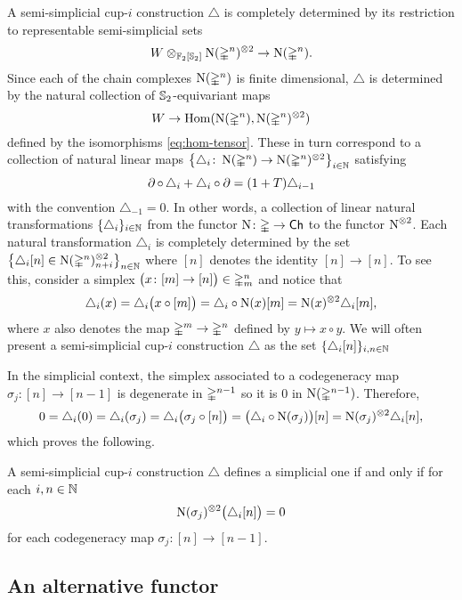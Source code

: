 A semi-simplicial cup-$i$ construction $\triangle$ is completely determined by its restriction to representable semi-simplicial sets
\[
W \ot_{\Ftwo[\Sym_2]} \chains(\simplex^n)^{\ot 2} \to \chains(\simplex^n).
\]
Since each of the chain complexes $\chains(\simplex^n)$ is finite dimensional, $\triangle$ is determined by the natural collection of $\Sym_2$-equivariant maps
\[
W \to \Hom(\chains(\simplex^n), \chains(\simplex^n)^{\ot 2})
\]
defined by the isomorphisms \eqref{eq:hom-tensor}.
These in turn correspond to a collection of natural linear maps $\set[\big]{\triangle_i \colon \chains(\simplex^n) \to \chains(\simplex^n)^{\ot 2}}_{i \in \N}$ satisfying
\[
\bd \circ \, \triangle_i + \triangle_i \circ \bd =
(1+T) \triangle_{i-1}
\]
with the convention $\triangle_{-1} = 0$.
In other words, a collection of linear natural transformations $\set{\triangle_i}_{i\in\N}$ from the functor $\chains \colon \simplex \to \Ch$ to the functor $\chains^{\ot 2}$.
Each natural transformation $\triangle_i$ is completely determined by the set $\set[\big]{\triangle_i[n] \in \chains(\simplex^n)^{\ot 2}_{n+i}}_{n\in\N}$ where $[n]$ denotes the identity $[n] \to [n]$.
To see this, consider a simplex $\big(x \colon [m] \to [n] \big) \in \simplex^n_m$ and notice that
\[
\triangle_i(x) = \triangle_i \big( x \circ [m] \big) =
\triangle_i \circ \chains(x) [m] =
\chains(x)^{\ot 2} \triangle_i[m],
\]
where $x$ also denotes the map $\simplex^m \to \simplex^n$ defined by $y \mapsto x \circ y$.
We will often present a semi-simplicial cup-$i$ construction $\triangle$ as the set $\set{\triangle_i[n]}_{i,n\in\N}$

In the simplicial context, the simplex associated to a codegeneracy map $\sigma_j \colon [n] \to [n-1]$ is degenerate in $\simplex^{n-1}$ so it is $0$ in $\chains(\simplex^{n-1})$.
Therefore,
\[
0 = \triangle_i(0) = \triangle_i(\sigma_j) =
\triangle_i \big( \sigma_j \circ [n] \big) =
\big( \triangle_i \circ \chains(\sigma_j) \big) [n] =
\chains(\sigma_j)^{\ot 2} \triangle_i[n],
\]
which proves the following.

\begin{lemma}
	A semi-simplicial cup-$i$ construction $\triangle$ defines a simplicial one if and only if for each $i,n\in\N$
	\[
	\chains(\sigma_j)^{\ot 2}\big(\triangle_i[n]\big) = 0
	\]
	for each codegeneracy map $\sigma_j \colon [n] \to [n-1]$.
\end{lemma}

\subsection{An alternative functor}\label{ss:alternative functor}

